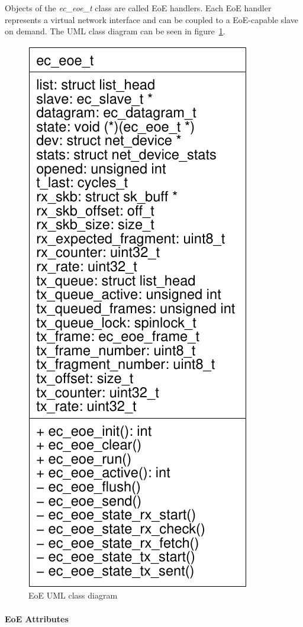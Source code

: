 \documentclass[a4paper,12pt,BCOR6mm,bibtotoc,idxtotoc]{scrbook}
\begin{document}
Objects of the \textit{ec\_eoe\_t} class are called EoE handlers. Each
EoE handler represents a virtual network interface and can be coupled
to a EoE-capable slave on demand. The UML class diagram can be seen in
figure~\ref{fig:uml-eoe}.

\begin{figure}[htbp]
  \centering
  \includegraphics[width=.4\textwidth]{images/uml-eoe}
  \caption{EoE UML class diagram}
  \label{fig:uml-eoe}
\end{figure}

\paragraph{EoE Attributes}
\end{document}
